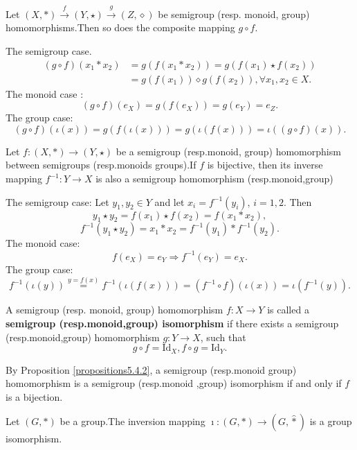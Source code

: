 \documentclass{book}
\numberwithin{equation}{section}
\begin{document}
\begin{propositionenv}\label{propositions5.4.2}
    Let $(X,*)\overset{f}{\rightarrow} (Y,\star)\overset{g}{\rightarrow}(Z,\diamond ) $ be semigroup (resp. monoid, group) homomorphisms.Then so does the composite mapping $g\circ f$.
\end{propositionenv}
\begin{proofenv}
    The semigroup case.
        \begin{align*}
            (g\circ f)(x_1*x_2) & = g(f(x_1*x_2))  = g(f(x_1)\star f(x_2)) \\
            & = g(f(x_1))\diamond g(f(x_2)),\forall x_1,x_2\in X.
        \end{align*}
    The monoid case :
    $$(g\circ f)(e_X)=g(f(e_X))=g(e_Y)=e_Z.$$
    The group case:
    $$(g\circ f)(\iota(x))=g(f(\iota(x)))=g(\iota(f(x)))=\iota((g\circ f)(x)).$$
\end{proofenv}
\begin{propositionenv}
    Let $f:(X,*)\rightarrow (Y,\star)$ be a semigroup (resp.monoid, group) homomorphism between semigroups (resp.monoids groups).If $f$ is bijective, then its inverse mapping $f^{-1}:Y\rightarrow X$ is also a semigroup homomorphism (resp.monoid,group) 
\end{propositionenv}
\begin{proofenv}
    The semigroup case: Let $y_1,y_2\in Y$ and let $x_i=f^{-1}(y_i),\,i=1,2$. Then 
    $$y_1\star y_2=f(x_1)\star f(x_2)=f(x_1*x_2),$$
    $$f^{-1}(y_1\star y_2)=x_1*x_2=f^{-1}(y_1)*f^{-1}(y_2).$$
    The monoid case:
    $$f(e_X)=e_Y\Rightarrow f^{-1}(e_Y)=e_X.$$
    The group case:
    $$f^{-1}(\iota(y))\overset{y=f(x)}{=}f^{-1}(\iota(f(x)))=(f^{-1}\circ f)(\iota(x))=\iota(f^{-1}(y)).$$
\end{proofenv}
\begin{definitionenv}
    A semigroup (resp. monoid, group) homomorphism $f:X\rightarrow Y$ is called a \textbf{semigroup (resp.monoid,group) isomorphism} if there exists a semigroup (resp.monoid,group) homomorphism $g:Y\rightarrow X$, such that 
    $$g\circ f=\mathrm{Id}_X,f\circ g=\mathrm{Id}_Y.$$
\end{definitionenv}
By Proposition \ref{propositions5.4.2}, a semigroup (resp.monoid group) homomorphism is a semigroup (resp.monoid ,group) isomorphism if and only if $f$ is a bijection.
\begin{propositionenv}
    Let $(G,*)$ be a group.The inversion mapping $\imath :(G,*)\rightarrow(G,\hat{*})$ is a group isomorphism.
\end{propositionenv}
\end{document}
